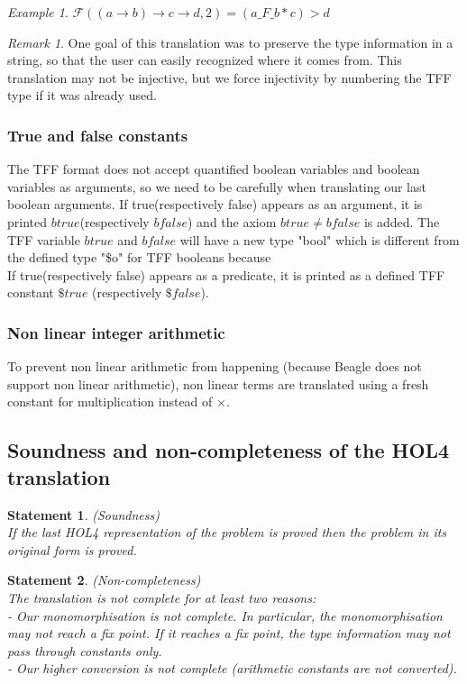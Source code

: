 \documentclass[a4paper, 11pt]{article}
\theoremstyle{plain}
\newtheorem*{stat}{Statement}
\theoremstyle{definition}
\theoremstyle{remark}
\newtheorem*{remark}{Remark}
\newtheorem*{example}{Example}
\begin{document}
\begin{example}
$\mathcal{F}( (a \rightarrow b) \rightarrow c \rightarrow d,2) = (a\_F\_b * c) > d$
\end{example}

\begin{remark} 
One goal of this translation was to preserve the type information in a string, so that the user can easily recognized where it comes from.
This translation may not be injective, but we force injectivity by numbering the TFF type if it was already used.
\end{remark}

\subsubsection{True and false constants}
 The TFF format does not accept quantified boolean variables and boolean variables as arguments, so we need to be carefully when translating our last boolean arguments.
 If true(respectively false) appears as an argument, it is printed $btrue$(respectively $bfalse$) and the axiom $btrue \neq bfalse$ is added. The TFF variable $btrue$ and $bfalse$ will have a new type "bool" which is different from the defined type "\$o" for TFF booleans because
\\If true(respectively false) appears as a predicate, it is printed as a defined TFF constant $\$true$ (respectively $\$false$).


\subsubsection{Non linear integer arithmetic}
To prevent non linear arithmetic from happening (because Beagle does not support non linear arithmetic), non linear terms are translated using a fresh constant for multiplication instead of $\times$.

\subsection{Soundness and non-completeness of the HOL4 translation}
\begin{stat} (Soundness) 
\\If the last HOL4 representation of the problem is proved then the problem in its original form is proved.
\end{stat}

\begin{stat} (Non-completeness)
\\The translation is not complete for at least two reasons:
\\- Our monomorphisation is not complete. In particular, the monomorphisation may not reach a fix point.
If it reaches a fix point, the type information may not pass through constants only. 
\\- Our higher conversion is not complete (arithmetic constants are not converted).
\end{stat}
\end{document}
